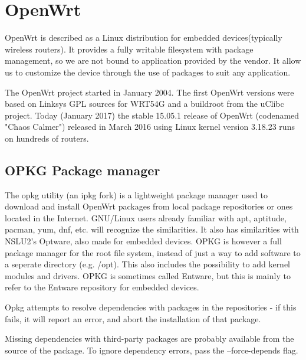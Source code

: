 \documentclass[../xdudla00-porting-Tang-to-Open-WRT.tex]{subfiles}
\begin{document}
\chapter{OpenWrt}\label{owrt}

OpenWrt is described as a Linux distribution for embedded devices(typically wireless routers).
It provides a fully writable filesystem with package management, so we are not bound to application provided by the vendor.
It allow us to customize the device through the use of packages to suit any application.

The OpenWrt project started in January 2004.
The first OpenWrt versions were based on Linksys GPL \cite{gpl} sources for WRT54G and a buildroot from the uClibc project.
Today (January 2017) the stable 15.05.1 release of OpenWrt (codenamed "Chaos Calmer") released in March 2016 using Linux kernel version 3.18.23 runs on hundreds of routers.

\section{OPKG Package manager}

The opkg utility (an ipkg fork) is a lightweight package manager used to download and install OpenWrt packages from local package repositories or ones located in the Internet.
GNU/Linux users already familiar with apt, aptitude, pacman, yum, dnf, etc. will recognize the similarities.
It also has similarities with NSLU2's Optware, also made for embedded devices.
OPKG is however a full package manager for the root file system, instead of just a way to add software to a seperate directory (e.g. /opt).
This also includes the possibility to add kernel modules and drivers.
OPKG is sometimes called Entware, but this is mainly to refer to the Entware repository for embedded devices.

Opkg attempts to resolve dependencies with packages in the repositories - if this fails, it will report an error, and abort the installation of that package.

Missing dependencies with third-party packages are probably available from the source of the package.
To ignore dependency errors, pass the --force-depends flag.
\end{document}
